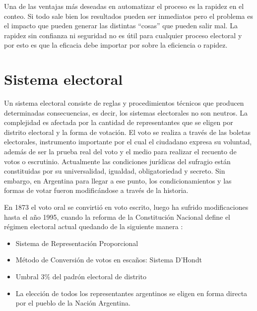 Una de las ventajas más deseadas en automatizar el proceso es la rapidez en el conteo. Si todo sale bien los resultados pueden ser inmediatos pero el problema es el impacto que pueden generar las distintas ``cosas'' que pueden salir mal. La rapidez sin confianza ni seguridad no es útil para cualquier proceso electoral y por esto es que la eficacia debe importar por sobre la eficiencia o rapidez.

\section{Sistema electoral}

Un sistema electoral consiste de reglas y procedimientos técnicos que producen determinadas consecuencias, es decir, los sistemas electorales no son neutros. 
La complejidad es afectada por la cantidad de representantes que se eligen por distrito electoral y la forma de votación. El voto se realiza a través de las boletas electorales, instrumento importante por el cual el ciudadano expresa su voluntad, además de ser la prueba real del voto y el medio para realizar el recuento de votos o escrutinio.
Actualmente las condiciones jurídicas del sufragio están constituidas por su universalidad, igualdad, obligatoriedad y secreto. Sin embargo, en Argentina para llegar a ese punto, los condicionamientos y las formas de votar fueron modificándose a través de la historia.

En 1873 el voto oral se convirtió en voto escrito, luego ha sufrido modificaciones hasta el año 1995, cuando la reforma de la Constitución Nacional define el régimen electoral actual quedando de la siguiente manera \cite{historia}:
\begin{itemize}
    \item Sistema de Representación Proporcional
    \item Método de Conversión de votos en escaños: Sistema D'Hondt \cite{flis2020pot}
    \item Umbral 3\% del padrón electoral de distrito
    \item La elección de todos los representantes argentinos se eligen en forma directa por el pueblo de la Nación Argentina.
\end{itemize}
\newline


